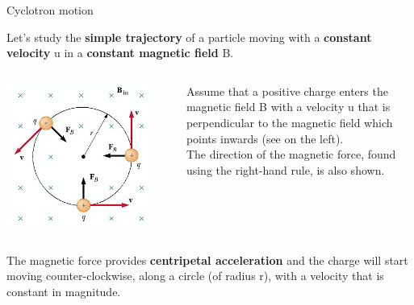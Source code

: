 \begin{frame}{Cyclotron motion}

Let's study the {\bf simple trajectory} of a particle moving with a
{\bf constant velocity} u in a {\bf constant magnetic field} B.\\
\vspace{0.2cm}
\begin{columns}
  \begin{column}{0.40\textwidth}
    \begin{center}
      \includegraphics[width=0.90\textwidth]{./images/schematics/cyclotron_motion_01.png}\\
    \end{center}
  \end{column}
  \begin{column}{0.60\textwidth}
     Assume that a positive charge enters the magnetic field B with a velocity u
     that is perpendicular to the magnetic field which points inwards (see on the left).\\
     \vspace{0.1cm}
     The direction of the magnetic force, found using the right-hand rule,
     is also shown.
  \end{column}
\end{columns}
\vspace{0.2cm}
The magnetic force provides {\bf centripetal acceleration} and the charge will start moving
counter-clockwise, along a circle (of radius r), with a velocity that is constant in magnitude.\\

\end{frame}

